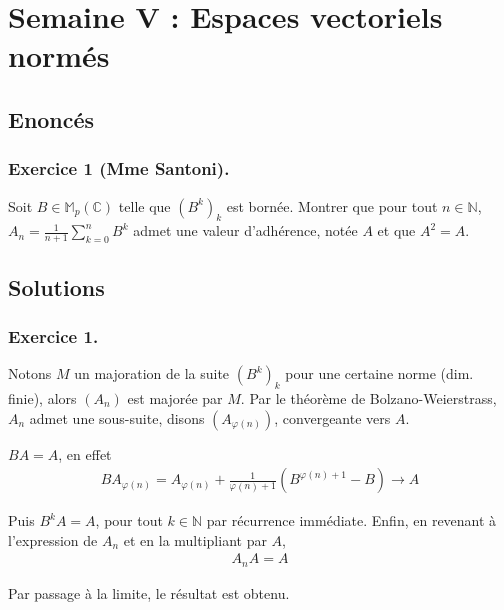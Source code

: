 \documentclass{article}
\begin{document}
\section{Semaine V : Espaces vectoriels normés}
\subsection*{Enoncés}
\subsubsection*{Exercice 1 (Mme Santoni).}
Soit $B \in\mathbb{M}_p(\mathbb{C})$ telle que $(B^k)_k$ est bornée. Montrer que pour tout $n\in\mathbb{N}$, $A_n = \displaystyle \frac{1}{n+1}\sum_{k=0}^n B^k$ admet une valeur d'adhérence, notée $A$ et que $A^2 = A$.
\subsection*{Solutions}
\subsubsection*{Exercice 1.}
Notons $M$ un majoration de la suite $(B^k)_k$ pour une certaine norme (dim. finie), alors $(A_n)$ est majorée par $M$. Par le théorème de Bolzano-Weierstrass, $A_n$ admet une sous-suite, disons $(A_{\varphi(n)})$, convergeante vers $A$.

$BA = A$, en effet
\begin{align*}
	B A_{\varphi(n)} = A_{\varphi(n)} + \frac{1}{\varphi(n)+1}(B^{\varphi(n)+1} - B) \to A
	\end{align*}

	Puis $B^{k}A = A$, pour tout $k\in\mathbb{N}$ par récurrence immédiate. Enfin, en revenant à l'expression de $A_n$ et en la multipliant par $A$,
	\begin{align*}
		A_nA =A
	\end{align*}

	Par passage à la limite, le résultat est obtenu.
	
\end{document}
